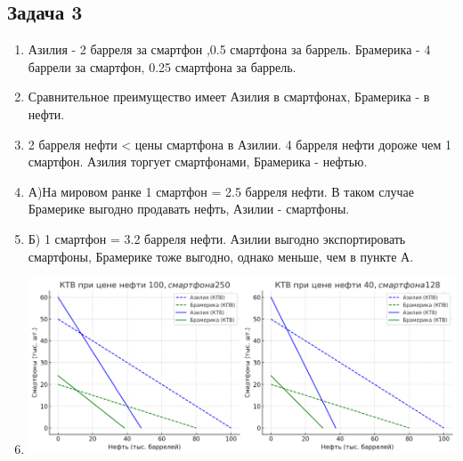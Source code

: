 \documentclass[a4paper,12pt]{article}
\begin{document}
\subsection{Задача 3}
\begin{enumerate}
    \item Азилия - 2 барреля за смартфон ,0.5 смартфона за баррель. Брамерика - 4 баррели за смартфон, 0.25 смартфона за баррель.
    \item Сравнительное преимущество имеет Азилия в смартфонах, Брамерика - в нефти.
    \item 2 барреля нефти < цены смартфона в Азилии. 4 барреля нефти дороже чем 1 смартфон. Азилия торгует смартфонами, Брамерика - нефтью.
    \item А)На мировом ранке 1 смартфон = 2.5 барреля нефти. В таком случае Брамерике выгодно продавать нефть, Азилии - смартфоны.
    \item Б) 1 смартфон = 3.2 барреля нефти. Азилии выгодно экспортировать смартфоны, Брамерике тоже выгодно, однако меньше, чем в пункте А.
    \item \includegraphics[scale=0.5]{graphs/1.2.png}
\end{enumerate}
\end{document}
